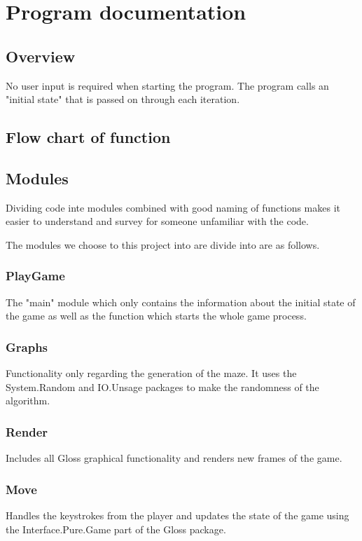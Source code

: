 \documentclass[12pt, a4paper]{article}
\begin{document}
\newpage
\section{Program documentation}

\subsection{Overview}
No user input is required when starting the program. The program calls an "initial state" that is passed on through each iteration. 

\subsection{Flow chart of function}


\subsection{Modules}
Dividing code inte modules combined with good naming of functions makes it easier to understand and survey for someone unfamiliar with the code.

The modules we choose to this project into are divide into are as follows.

\subsubsection*{PlayGame}
The "main" module which only contains the information about the initial state of the game as well as the function which starts the whole game process.

\subsubsection*{Graphs}
Functionality only regarding the generation of the maze. It uses the System.Random and IO.Unsage packages to make the randomness of the algorithm.

\subsubsection*{Render}
Includes all Gloss graphical functionality and renders new frames of the game.

\subsubsection*{Move}
Handles the keystrokes from the player and updates the state of the game using the Interface.Pure.Game part of the Gloss package.
\end{document}
